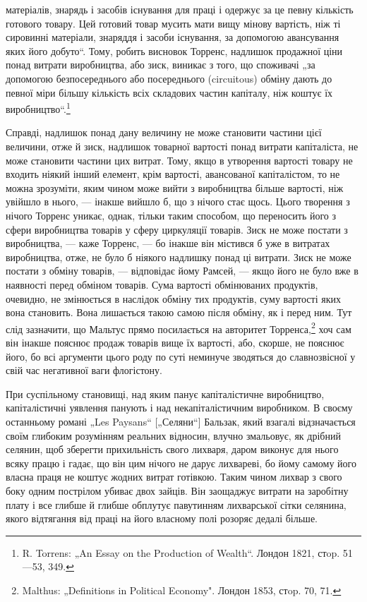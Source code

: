 матеріалів, знарядь і засобів існування для праці і одержує за
це певну кількість готового товару. Цей готовий товар мусить
мати вищу мінову вартість, ніж ті сировинні матеріали, знаряддя
і засоби існування, за допомогою авансування яких його
добуто“. Тому, робить висновок Торренс, надлишок продажної ціни
понад витрати виробництва, або зиск, виникає з того, що споживачі
„за допомогою безпосереднього або посереднього (circuitous)
обміну дають до певної міри більшу кількість всіх складових
частин капіталу, ніж коштує їх виробництво“.\footnote{
R. Torrens: „An Essay on the Production of Wealth“. Лондон 1821, стop.
51—53, 349.
}

Справді, надлишок понад дану величину не може становити
частини цієї величини, отже й зиск, надлишок товарної вартості
понад витрати капіталіста, не може становити частини цих витрат.
Тому, якщо в утворення вартості товару не входить
ніякий інший елемент, крім вартості, авансованої капіталістом,
то не можна зрозуміти, яким чином може вийти з виробництва
більше вартості, ніж увійшло в нього, — інакше вийшло б, що
з нічого стає щось. Цього творення з нічого Торренс уникає,
однак, тільки таким способом, що переносить його з сфери виробництва
товарів у сферу циркуляції товарів. Зиск не може постати
з виробництва, — каже Торренс, — бо інакше він містився б уже
в витратах виробництва, отже, не було б ніякого надлишку понад
ці витрати. Зиск не може постати з обміну товарів, — відповідає
йому Рамсей, — якщо його не було вже в наявності перед обміном
товарів. Сума вартості обмінюваних продуктів, очевидно,
не змінюється в наслідок обміну тих продуктів, суму вартості
яких вона становить. Вона лишається такою самою після обміну,
як і перед ним. Тут слід зазначити, що Мальтус прямо посилається
на авторитет Торренса,\footnote{
Malthus: „Definitions in Political Economy". Лондон 1853, стop. 70, 71.
} хоч сам він інакше пояснює
продаж товарів вище їх вартості, або, скорше, не пояснює його,
бо всі аргументи цього роду по суті неминуче зводяться до
славнозвісної у свій час негативної ваги флогістону.

При суспільному становищі, над яким панує капіталістичне виробництво,
капіталістичні уявлення панують і над некапіталістичним
виробником. В своєму останньому романі „Les Paysans“
[„Селяни“] Бальзак, який взагалі відзначається своїм глибоким
розумінням реальних відносин, влучно змальовує, як дрібний
селянин, щоб зберегти прихильність свого лихваря, даром виконує
для нього всяку працю і гадає, що він цим нічого не
дарує лихвареві, бо йому самому його власна праця не коштує
жодних витрат готівкою. Таким чином лихвар з свого боку
одним пострілом убиває двох зайців. Він заощаджує витрати
на заробітну плату і все глибше й глибше обплутує павутинням
лихварської сітки селянина, якого відтягання від праці на його
власному полі розоряє дедалі більше.